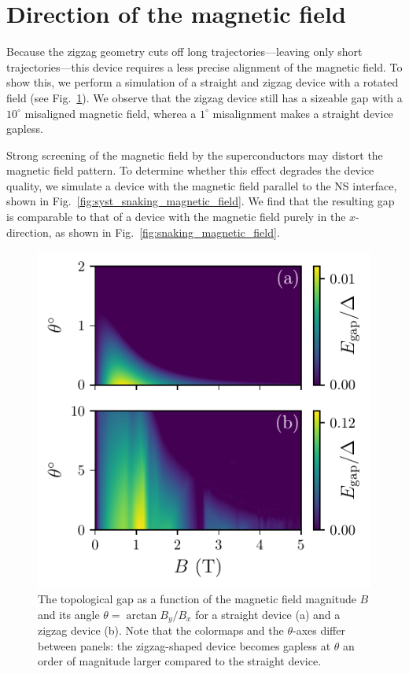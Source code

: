 \section{Direction of the magnetic field}\label{appendix:direction_B}

Because the zigzag geometry cuts off long trajectories---leaving only short trajectories---this device requires a less precise alignment of the magnetic field.
To show this, we perform a simulation of a straight and zigzag device with a rotated field (see Fig.~\ref{fig:tilted_angle_phase_diagram}).
We observe that the zigzag device still has a sizeable gap with a $10^\circ$ misaligned magnetic field, wherea a $1^\circ$ misalignment makes a straight device gapless.

Strong screening of the magnetic field by the superconductors may distort the magnetic field pattern.
To determine whether this effect degrades the device quality, we simulate a device with the magnetic field parallel to the NS interface, shown in Fig.~\ref{fig:syst_snaking_magnetic_field}.
We find that the resulting gap is comparable to that of a device with the magnetic field purely in the $x$-direction, as shown in Fig.~\ref{fig:snaking_magnetic_field}.

\begin{figure}
\begin{center}
\includegraphics[width=0.6\columnwidth]{chapter_zigzag/figures/tilted_angle_phase_diagram.pdf}
\caption{The topological gap as a function of the magnetic field magnitude $B$ and its angle $\theta=\arctan{B_y/B_x}$ for a straight device (a) and a zigzag device (b).
Note that the colormaps and the $\theta$-axes differ between panels: the zigzag-shaped device becomes gapless at $\theta$ an order of magnitude larger compared to the straight device.
\label{fig:tilted_angle_phase_diagram}}
\end{center}
\end{figure}

